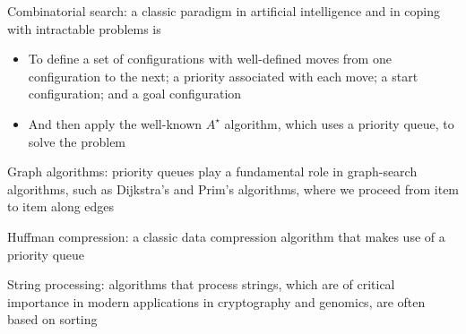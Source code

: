 \documentclass[8pt,a4paper,compress]{beamer}
\begin{document}
\begin{frame}[fragile]
Combinatorial search: a classic paradigm in artificial intelligence and in coping with intractable problems is
\begin{itemize}
\item To define a set of configurations with well-defined moves from one configuration to the next; a priority associated with each move; a start configuration; and a goal configuration  

\item And then apply the well-known $A^\star$ algorithm, which uses a priority queue, to solve the problem
\end{itemize}

\bigskip

Graph algorithms: priority queues play a fundamental role in graph-search algorithms, such as Dijkstra's and Prim's algorithms, where we proceed from item to item along edges

\bigskip

Huffman compression: a classic data compression algorithm that makes use of a priority queue

\bigskip

String processing: algorithms that process strings, which are of critical importance in modern applications in cryptography and genomics, are often based on sorting
\end{frame}
\end{document}
